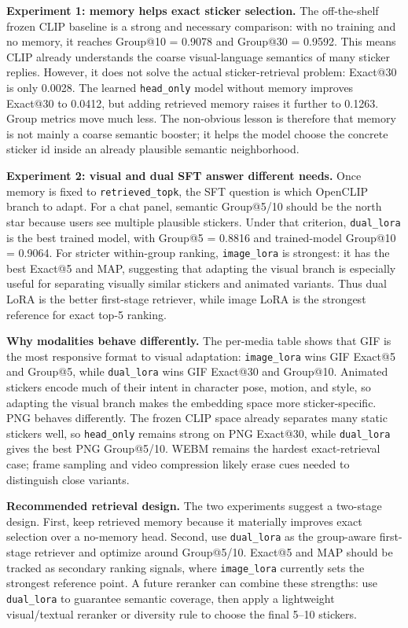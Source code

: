 \documentclass[10pt,twocolumn,letterpaper]{article}
\begin{document}
\noindent\textbf{Experiment 1: memory helps exact sticker selection.}
The off-the-shelf frozen CLIP baseline is a strong and necessary comparison:
with no training and no memory, it reaches Group@10 = 0.9078 and Group@30 =
0.9592. This means CLIP already understands the coarse visual-language
semantics of many sticker replies. However, it does not solve the actual
sticker-retrieval problem: Exact@30 is only 0.0028. The learned
\texttt{head\_only} model without memory improves Exact@30 to 0.0412, but
adding retrieved memory raises it further to 0.1263. Group metrics move much
less. The non-obvious lesson is therefore that memory is not mainly a coarse
semantic booster; it helps the model choose the concrete sticker id inside an
already plausible semantic neighborhood.

\noindent\textbf{Experiment 2: visual and dual SFT answer different needs.}
Once memory is fixed to \texttt{retrieved\_topk}, the SFT question is which
OpenCLIP branch to adapt. For a chat panel, semantic Group@5/10 should be the
north star because users see multiple plausible stickers. Under that criterion,
\texttt{dual\_lora} is the best trained model, with Group@5 = 0.8816 and
trained-model Group@10 = 0.9064. For stricter within-group ranking,
\texttt{image\_lora} is strongest: it has the best Exact@5 and MAP, suggesting
that adapting the visual branch is especially useful for separating visually
similar stickers and animated variants. Thus dual LoRA is the better first-stage
retriever, while image LoRA is the strongest reference for exact top-5 ranking.

\noindent\textbf{Why modalities behave differently.}
The per-media table shows that GIF is the most responsive format to visual
adaptation: \texttt{image\_lora} wins GIF Exact@5 and Group@5, while
\texttt{dual\_lora} wins GIF Exact@30 and Group@10. Animated stickers encode
much of their intent in character pose, motion, and style, so adapting the
visual branch makes the embedding space more sticker-specific. PNG behaves
differently. The frozen CLIP space already separates many static stickers
well, so \texttt{head\_only} remains strong on PNG Exact@30, while
\texttt{dual\_lora} gives the best PNG Group@5/10. WEBM remains the hardest
exact-retrieval case; frame sampling and video compression likely erase cues
needed to distinguish close variants.

\noindent\textbf{Recommended retrieval design.}
The two experiments suggest a two-stage design. First, keep retrieved memory
because it materially improves exact selection over a no-memory head. Second,
use \texttt{dual\_lora} as the group-aware first-stage retriever and optimize
around Group@5/10. Exact@5 and MAP should be tracked as secondary ranking
signals, where \texttt{image\_lora} currently sets the strongest reference
point. A future reranker can combine these strengths: use \texttt{dual\_lora}
to guarantee semantic coverage, then apply a lightweight visual/textual
reranker or diversity rule to choose the final 5--10 stickers.
\end{document}
